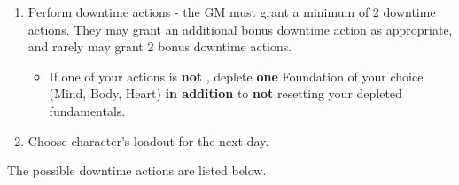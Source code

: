 \begin{enumerate}
	\item Perform downtime actions - the GM must grant a minimum of 2 downtime actions. They may grant an additional bonus downtime action as appropriate, and rarely may grant 2 bonus downtime actions.
	\begin{itemize}
		\item If one of your actions is \textbf{not} , deplete \textbf{one} Foundation of your choice (Mind, Body, Heart) \textbf{in addition} to \textbf{not} resetting your depleted fundamentals.
	\end{itemize}
	\item Choose character's loadout for the next day.
\end{enumerate}

The possible downtime actions are listed below.

